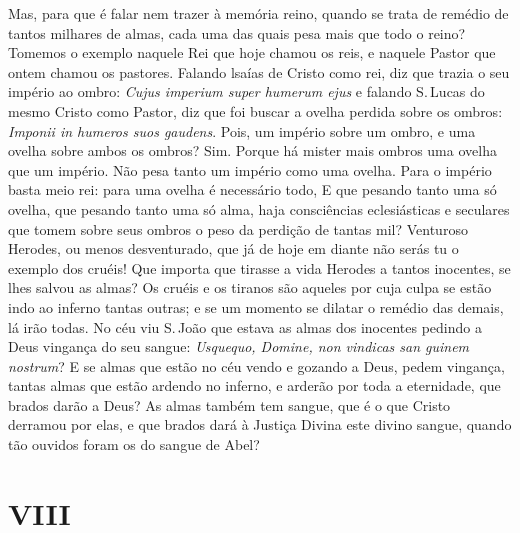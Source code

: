 Mas, para que é falar nem trazer à memória reino, quando se trata de
remédio de tantos milhares de almas, cada uma das quais pesa mais que
todo o reino? Tomemos o exemplo naquele Rei que hoje chamou os reis, e
naquele Pastor que ontem chamou os pastores. Falando lsaías de Cristo
como rei, diz que trazia o seu império ao ombro: \emph{Cujus imperium
super humerum ejus} e falando S.\,Lucas do mesmo Cristo como Pastor,
diz que foi buscar a ovelha perdida sobre os ombros: \emph{Imponii in
humeros suos gaudens}. Pois, um império sobre um ombro, e uma
ovelha sobre ambos os ombros? Sim. Porque há mister mais ombros uma
ovelha que um império. Não pesa tanto um império como uma ovelha. Para o
império basta meio rei: para uma ovelha é necessário todo, E que pesando
tanto uma só ovelha, que pesando tanto uma só alma, haja consciências
eclesiásticas e seculares que tomem sobre seus ombros o peso da perdição
de tantas mil? Venturoso Herodes, ou menos desventurado, que já de hoje
em diante não serás tu o exemplo dos cruéis! Que importa que tirasse a
vida Herodes a tantos inocentes, se lhes salvou as almas? Os cruéis e os
tiranos são aqueles por cuja culpa se estão indo ao inferno tantas
outras; e se um momento se dilatar o remédio das demais, lá irão todas.
No céu viu S.\,João que estava as almas dos inocentes pedindo a Deus
vingança do seu sangue: \emph{Usquequo, Domine, non vindicas san guinem
nostrum}? E se almas que estão no céu vendo e gozando a
Deus, pedem vingança, tantas almas que estão ardendo no inferno, e
arderão por toda a eternidade, que brados darão a Deus?
As almas também tem sangue, que é o que Cristo derramou por elas, e que
brados dará à Justiça Divina este divino sangue, quando tão ouvidos
foram os do sangue de Abel?

\section{VIII}


